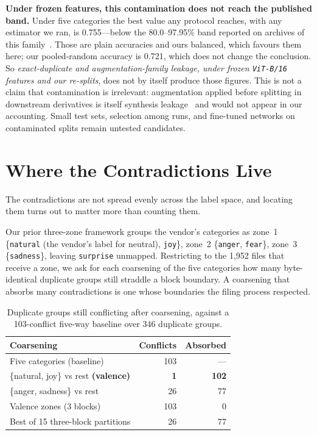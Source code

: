 \documentclass[conference,10pt]{IEEEtran}
\begin{document}
\textbf{Under frozen features, this contamination does not reach the published
band.} Under five categories the best value any protocol reaches, with any
estimator we ran, is 0.755---below the 80.0--97.95\% band reported on archives of this
family~\cite{radocaj2025,hanumantharayappa2026}. Those are plain accuracies and ours
balanced, which favours them here; our pooled-random accuracy is 0.721, which
does not change the conclusion. So \emph{exact-duplicate and
augmentation-family leakage, under frozen \texttt{ViT-B/16} features and our
re-splits}, does not by itself produce those figures. This is not a claim that contamination is
irrelevant: augmentation applied before splitting in downstream derivatives is
itself synthesis leakage~\cite{apicella2025} and would not appear in our
accounting. Small test sets, selection among runs, and fine-tuned networks on
contaminated splits remain untested candidates.

\section{Where the Contradictions Live}
\label{sec:zones}
The contradictions are not spread evenly across the label space, and locating
them turns out to matter more than counting them.

Our prior three-zone framework groups the vendor's categories as zone~1
\{\texttt{natural} (the vendor's label for neutral), \texttt{joy}\}, zone~2
\{\texttt{anger}, \texttt{fear}\}, zone~3 \{\texttt{sadness}\}, leaving
\texttt{surprise} unmapped. Restricting to the 1{,}952 files that receive a
zone, we ask for each coarsening of the five categories how many byte-identical
duplicate groups still straddle a block boundary. A coarsening that absorbs many
contradictions is one whose boundaries the filing process respected.

\begin{table}[t]
\caption{Duplicate groups still conflicting after coarsening, against a
103-conflict five-way baseline over 346 duplicate groups.}
\label{tab:conflicts}
\centering
\setlength{\tabcolsep}{3pt}
\begin{tabular}{lrr}
\toprule
Coarsening & Conflicts & Absorbed\\
\midrule
Five categories (baseline) & 103 & ---\\
\{natural, joy\} vs rest \textbf{(valence)} & \textbf{1} & \textbf{102}\\
\{anger, sadness\} vs rest & 26 & 77\\
Valence zones (3 blocks) & 103 & 0\\
Best of 15 three-block partitions & 26 & 77\\
\bottomrule
\end{tabular}
\end{table}
\end{document}
